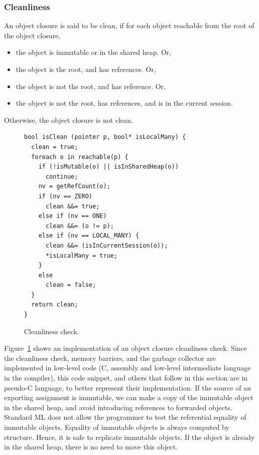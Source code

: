 \subsubsection{Cleanliness}

An object closure is said to be clean, if for each object reachable from the
root of the object closure,

\begin{itemize}
\item the object is immutable or in the shared heap. Or,
\item the object is the root, and has  references. Or,
\item the object is not the root, and has  reference. Or,
\item the object is not the root, has  references, and is in the
current session.
\end{itemize}

\noindent Otherwise, the object closure is not clean.

\begin{figure}[t]
\begin{lstlisting}
bool isClean (pointer p, bool* isLocalMany) {
  clean = true;
  foreach o in reachable(p) {
    if (!isMutable(o) || isInSharedHeap(o))
      continue;
    nv = getRefCount(o);
    if (nv == ZERO)
      clean &&= true;
    else if (nv == ONE)
      clean &&= (o != p);
    else if (nv == LOCAL_MANY) {
      clean &&= (isInCurrentSession(o));
      *isLocalMany = true;
    }
    else
      clean = false;
  }
  return clean;
}
\end{lstlisting}
\caption{Cleanliness check.}
\label{code:cleanliness}
\end{figure}

Figure~\ref{code:cleanliness} shows an implementation of an object closure
cleanliness check. Since the cleanliness check, memory barriers, and the
garbage collector are implemented in low-level code (C, assembly and low-level
intermediate language in the compiler), this code snippet, and others that
follow in this section are in pseudo-C language, to better represent their
implementation. If the source of an exporting assignment is immutable, we can
make a copy of the immutable object in the shared heap, and avoid introducing
references to forwarded objects. Standard ML does not allow the programmer to
test the referential equality of immutable objects. Equality of immutable
objects is always computed by structure. Hence, it is safe to replicate
immutable objects. If the object is already in the shared heap, there is no
need to move this object.


